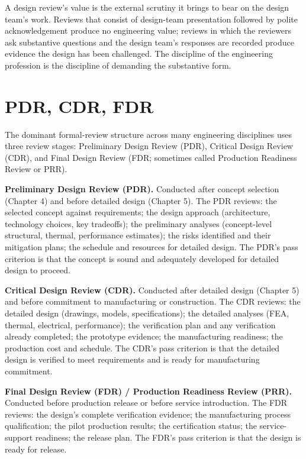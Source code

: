 \begin{principle}
A design review's value is the external scrutiny it brings to bear on the design team's work. Reviews that consist of design-team presentation followed by polite acknowledgement produce no engineering value; reviews in which the reviewers ask substantive questions and the design team's responses are recorded produce evidence the design has been challenged. The discipline of the engineering profession is the discipline of demanding the substantive form.
\end{principle}

\section{PDR, CDR, FDR}

The dominant formal-review structure across many engineering disciplines uses three review stages: Preliminary Design Review (PDR), Critical Design Review (CDR), and Final Design Review (FDR; sometimes called Production Readiness Review or PRR).

\textbf{Preliminary Design Review (PDR).} Conducted after concept selection (Chapter 4) and before detailed design (Chapter 5). The PDR reviews: the selected concept against requirements; the design approach (architecture, technology choices, key tradeoffs); the preliminary analyses (concept-level structural, thermal, performance estimates); the risks identified and their mitigation plans; the schedule and resources for detailed design. The PDR's pass criterion is that the concept is sound and adequately developed for detailed design to proceed.

\textbf{Critical Design Review (CDR).} Conducted after detailed design (Chapter 5) and before commitment to manufacturing or construction. The CDR reviews: the detailed design (drawings, models, specifications); the detailed analyses (FEA, thermal, electrical, performance); the verification plan and any verification already completed; the prototype evidence; the manufacturing readiness; the production cost and schedule. The CDR's pass criterion is that the detailed design is verified to meet requirements and is ready for manufacturing commitment.

\textbf{Final Design Review (FDR) / Production Readiness Review (PRR).} Conducted before production release or before service introduction. The FDR reviews: the design's complete verification evidence; the manufacturing process qualification; the pilot production results; the certification status; the service-support readiness; the release plan. The FDR's pass criterion is that the design is ready for release.

